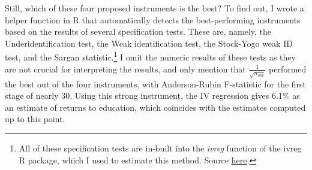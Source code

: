 \begin{table}[!t]
  \centering
  \footnotesize
  \singlespace
  \caption{Relaxing the exogeneity assumption}
  \label{tab:IV-p}
\end{table}

Still, which of these four proposed instruments is the best? To find out, I wrote a helper function in R that automatically detects the best-performing instruments based on the results of several specification tests. These are, namely, the Underidentification test, the Weak identification test, the Stock-Yogo weak ID test, and the Sargan statistic.\footnote{All of these specification tests are in-built into the \textit{ivreg} function of the {ivreg} R package, which I used to estimate this method. Source \href{https://cran.r-project.org/package=ivreg}{here}.} I omit the numeric results of these tests as they are not crucial for interpreting the results, and only mention that $\frac{1}{\sqrt{n_{\text{obs}}}}$ performed the best out of the four instruments, with Anderson-Rubin F-statistic for the first stage of nearly 30. Using this strong instrument, the \ac{IV} regression gives 6.1\% as an estimate of returns to education, which coincides with the estimates computed up to this point.

